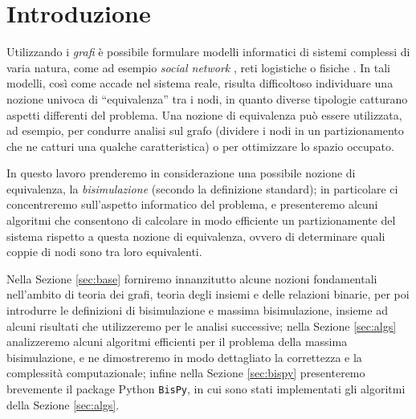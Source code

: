 \section{Introduzione}
Utilizzando i \emph{grafi} è possibile formulare modelli informatici di sistemi complessi di varia natura, come ad esempio \emph{social network} \cite{twitter}, reti logistiche \cite{supply} o fisiche \cite{electric}. In tali modelli, così come accade nel sistema reale, risulta difficoltoso individuare una nozione univoca di ``equivalenza'' tra i nodi, in quanto diverse tipologie catturano aspetti differenti del problema. Una nozione di equivalenza può essere utilizzata, ad esempio, per condurre analisi sul grafo (dividere i nodi in un partizionamento che ne catturi una qualche caratteristica) o per ottimizzare lo spazio occupato.

In questo lavoro prenderemo in considerazione una possibile nozione di equivalenza, la \emph{bisimulazione} (secondo la definizione standard); in particolare ci concentreremo sull'aspetto informatico del problema, e presenteremo alcuni algoritmi che consentono di calcolare in modo efficiente un partizionamente del sistema rispetto a questa nozione di equivalenza, ovvero di determinare quali coppie di nodi sono tra loro equivalenti.

Nella Sezione \ref{sec:base} forniremo innanzitutto alcune nozioni fondamentali nell'ambito di teoria dei grafi, teoria degli insiemi e delle relazioni binarie, per poi introdurre le definizioni di bisimulazione e massima bisimulazione, insieme ad alcuni risultati che utilizzeremo per le analisi successive; nella Sezione \ref{sec:algs} analizzeremo alcuni algoritmi efficienti per il problema della massima bisimulazione, e ne dimostreremo in modo dettagliato la correttezza e la complessità computazionale; infine nella Sezione \ref{sec:bispy} presenteremo brevemente il package Python \texttt{BisPy}, in cui sono stati implementati gli algoritmi della Sezione \ref{sec:algs}.
